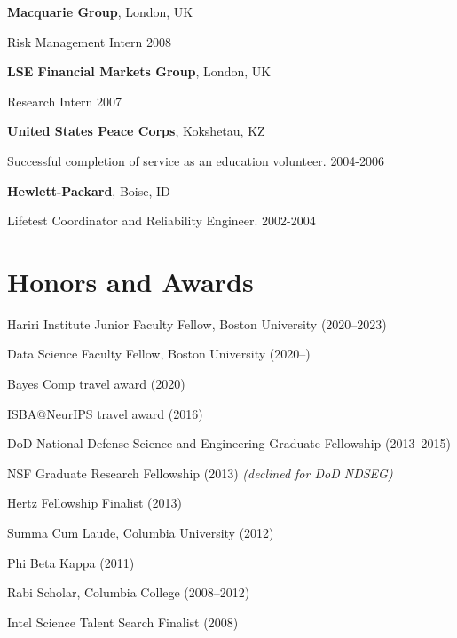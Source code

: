 \documentclass[margin,line]{res}
\newenvironment{list1}{
  \begin{list}{\ding{113}}{%
      \setlength{\itemsep}{0in}
      \setlength{\parsep}{0in} \setlength{\parskip}{0in}
      \setlength{\topsep}{0in} \setlength{\partopsep}{0in}
      \setlength{\leftmargin}{0in}}}{\end{list}} %
\begin{document}
\begin{resume}
{\bf Macquarie Group}, London, UK
\begin{list1}
\item[] Risk Management Intern \hfill {2008}
\end{list1}

{\bf LSE Financial Markets Group}, London, UK
\begin{list1}
\item[] Research Intern \hfill {2007}
\end{list1}

{\bf United States Peace Corps}, Kokshetau, KZ
\begin{list1}
\item[] Successful completion of service as an education volunteer. \hfill {2004-2006}
\end{list1}

{\bf Hewlett-Packard}, Boise, ID
\begin{list1}
\item[] Lifetest Coordinator and Reliability Engineer. \hfill {2002-2004}
\end{list1}



\section{\sc Honors and Awards}

\begin{list1}
\item[] Hariri Institute Junior Faculty Fellow, Boston University (2020--2023)
\item[] Data Science Faculty Fellow, Boston University (2020--)
\item[] Bayes Comp travel award (2020)
\item[] ISBA@NeurIPS travel award (2016)
\item[] DoD National Defense Science and Engineering Graduate Fellowship (2013--2015)
\item[] NSF Graduate Research Fellowship (2013) {\em (declined for DoD NDSEG)}
\item[] Hertz Fellowship Finalist (2013)
\item[] Summa Cum Laude, Columbia University (2012)
\item[] Phi Beta Kappa (2011)
\item[] Rabi Scholar, Columbia College (2008--2012)
\item[] Intel Science Talent Search Finalist (2008)
\end{list1}




\end{resume}
\end{document}
